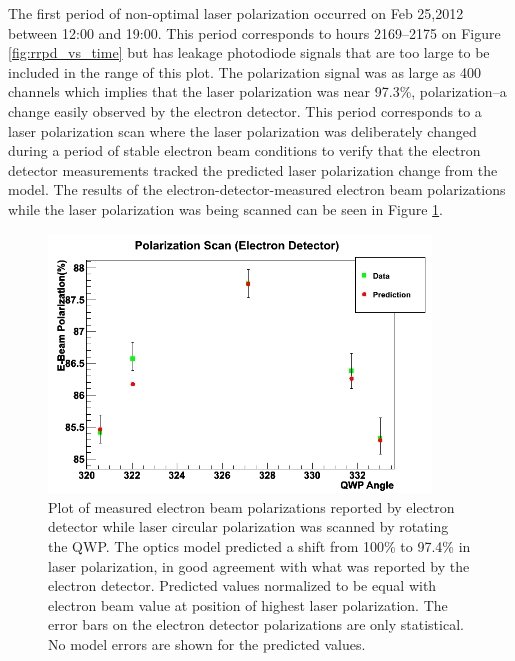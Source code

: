 The first period of non-optimal laser polarization occurred on Feb 25,2012 between 12:00 and 19:00. This period corresponds to hours 2169--2175 on Figure \ref{fig:rrpd_vs_time} but has leakage photodiode signals that are too large to be included in the range of this plot. The polarization signal was as large as 400 channels which implies that the laser polarization was near 97.3\%, polarization--a change easily observed by the electron detector. This period corresponds to a laser polarization scan where the laser polarization was deliberately changed during a period of stable electron beam conditions to verify that the electron detector measurements tracked the predicted laser polarization change from the model. The results of the electron-detector-measured electron beam polarizations while the laser polarization was being scanned can be seen in Figure \ref{fig:las_pol_scan}.
\begin{figure}[ht]
\begin{center}
\includegraphics[width=4.0in]{./Pictures/las_pol_scan.png}
\caption{\label{fig:las_pol_scan}Plot of measured electron beam polarizations reported by electron detector while laser circular polarization was scanned by rotating the QWP. The optics model predicted a shift from 100\% to 97.4\% in laser polarization, in good agreement with what was reported by the electron detector. Predicted values normalized to be equal with electron beam value at position of highest laser polarization. The error bars on the electron detector polarizations are only statistical. No model errors are shown for the predicted values.}
\end{center}
\end{figure} 

